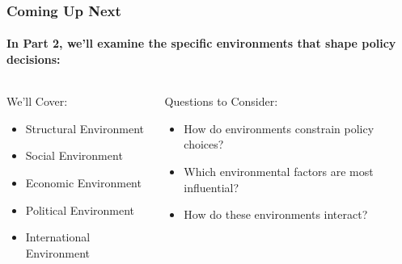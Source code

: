 \documentclass[10pt]{beamer}
\begin{document}
\begin{frame}
\frametitle{Coming Up Next}
\framesubtitle{In Part 2, we'll examine the specific environments that shape policy decisions:}

\begin{columns}
\begin{column}{0.48\textwidth}
\begin{block}{We'll Cover:}
\begin{itemize}
\item Structural Environment
\item Social Environment
\item Economic Environment
\item Political Environment
\item International Environment
\end{itemize}
\end{block}
\end{column}

\begin{column}{0.48\textwidth}
\begin{block}{Questions to Consider:}
\begin{itemize}
\item How do environments constrain policy choices?
\item Which environmental factors are most influential?
\item How do these environments interact?
\end{itemize}
\end{block}
\end{column}
\end{columns}

\end{frame}
\end{document}
